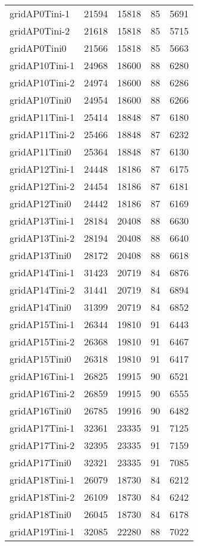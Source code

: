 \begin{longtable}{lrrrr}
gridAP0Tini-1 & 21594 & 15818 & 85 & 5691 \\
gridAP0Tini-2 & 21618 & 15818 & 85 & 5715 \\
gridAP0Tini0 & 21566 & 15818 & 85 & 5663 \\
gridAP10Tini-1 & 24968 & 18600 & 88 & 6280 \\
gridAP10Tini-2 & 24974 & 18600 & 88 & 6286 \\
gridAP10Tini0 & 24954 & 18600 & 88 & 6266 \\
gridAP11Tini-1 & 25414 & 18848 & 87 & 6180 \\
gridAP11Tini-2 & 25466 & 18848 & 87 & 6232 \\
gridAP11Tini0 & 25364 & 18848 & 87 & 6130 \\
gridAP12Tini-1 & 24448 & 18186 & 87 & 6175 \\
gridAP12Tini-2 & 24454 & 18186 & 87 & 6181 \\
gridAP12Tini0 & 24442 & 18186 & 87 & 6169 \\
gridAP13Tini-1 & 28184 & 20408 & 88 & 6630 \\
gridAP13Tini-2 & 28194 & 20408 & 88 & 6640 \\
gridAP13Tini0 & 28172 & 20408 & 88 & 6618 \\
gridAP14Tini-1 & 31423 & 20719 & 84 & 6876 \\
gridAP14Tini-2 & 31441 & 20719 & 84 & 6894 \\
gridAP14Tini0 & 31399 & 20719 & 84 & 6852 \\
gridAP15Tini-1 & 26344 & 19810 & 91 & 6443 \\
gridAP15Tini-2 & 26368 & 19810 & 91 & 6467 \\
gridAP15Tini0 & 26318 & 19810 & 91 & 6417 \\
gridAP16Tini-1 & 26825 & 19915 & 90 & 6521 \\
gridAP16Tini-2 & 26859 & 19915 & 90 & 6555 \\
gridAP16Tini0 & 26785 & 19916 & 90 & 6482 \\
gridAP17Tini-1 & 32361 & 23335 & 91 & 7125 \\
gridAP17Tini-2 & 32395 & 23335 & 91 & 7159 \\
gridAP17Tini0 & 32321 & 23335 & 91 & 7085 \\
gridAP18Tini-1 & 26079 & 18730 & 84 & 6212 \\
gridAP18Tini-2 & 26109 & 18730 & 84 & 6242 \\
gridAP18Tini0 & 26045 & 18730 & 84 & 6178 \\
gridAP19Tini-1 & 32085 & 22280 & 88 & 7022 \\

\end{longtable}
